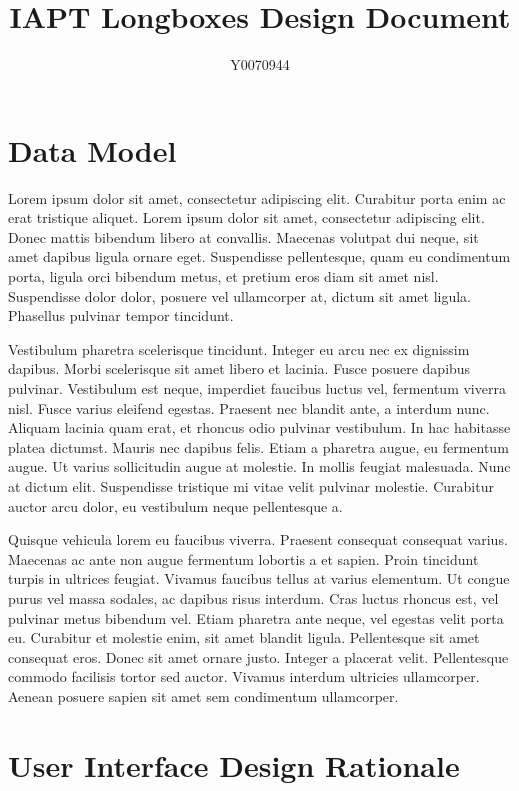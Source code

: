 \documentclass[fontsize=12pt,a4paper]{scrreprt}
\author{Y0070944}
\title{IAPT Longboxes Design Document}
\begin{document}
\maketitle
\setcounter{page}{1}

\chapter{Data Model}

Lorem ipsum dolor sit amet, consectetur adipiscing elit. Curabitur porta enim ac erat tristique aliquet. Lorem ipsum dolor sit amet, consectetur adipiscing elit. Donec mattis bibendum libero at convallis. Maecenas volutpat dui neque, sit amet dapibus ligula ornare eget. Suspendisse pellentesque, quam eu condimentum porta, ligula orci bibendum metus, et pretium eros diam sit amet nisl. Suspendisse dolor dolor, posuere vel ullamcorper at, dictum sit amet ligula. Phasellus pulvinar tempor tincidunt.

Vestibulum pharetra scelerisque tincidunt. Integer eu arcu nec ex dignissim dapibus. Morbi scelerisque sit amet libero et lacinia. Fusce posuere dapibus pulvinar. Vestibulum est neque, imperdiet faucibus luctus vel, fermentum viverra nisl. Fusce varius eleifend egestas. Praesent nec blandit ante, a interdum nunc. Aliquam lacinia quam erat, et rhoncus odio pulvinar vestibulum. In hac habitasse platea dictumst. Mauris nec dapibus felis. Etiam a pharetra augue, eu fermentum augue. Ut varius sollicitudin augue at molestie. In mollis feugiat malesuada. Nunc at dictum elit. Suspendisse tristique mi vitae velit pulvinar molestie. Curabitur auctor arcu dolor, eu vestibulum neque pellentesque a.

Quisque vehicula lorem eu faucibus viverra. Praesent consequat consequat varius. Maecenas ac ante non augue fermentum lobortis a et sapien. Proin tincidunt turpis in ultrices feugiat. Vivamus faucibus tellus at varius elementum. Ut congue purus vel massa sodales, ac dapibus risus interdum. Cras luctus rhoncus est, vel pulvinar metus bibendum vel. Etiam pharetra ante neque, vel egestas velit porta eu. Curabitur et molestie enim, sit amet blandit ligula. Pellentesque sit amet consequat eros. Donec sit amet ornare justo. Integer a placerat velit. Pellentesque commodo facilisis tortor sed auctor. Vivamus interdum ultricies ullamcorper. Aenean posuere sapien sit amet sem condimentum ullamcorper.

\chapter{User Interface Design Rationale}
\end{document}
